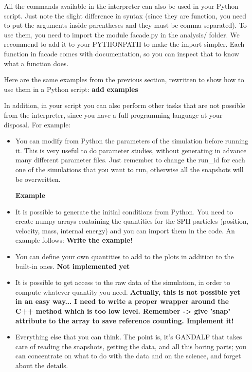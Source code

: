 \documentclass[a4paper]{article}
\begin{document}
All the commands available in the interpreter can also be used in your Python script. Just note the slight difference in syntax (since they are function, you need to put the arguments inside parentheses and they must be comma-separated). To use them, you need to import the module facade.py in the analysis/ folder. We recommend to add it to your PYTHONPATH to make the import simpler. Each function in facade comes with documentation, so you can inspect that to know what a function does.

Here are the same examples from the previous section, rewritten to show how to use them in a Python script:
\textbf{add examples}

In addition, in your script you can also perform other tasks that are not possible from the interpreter, since you have a full programming language at your disposal. For example:
\begin{itemize}

\item You can modify from Python the parameters of the simulation before running it. This is very useful to do parameter studies, without generating in advance many different parameter files. Just remember to change the run\_id for each one of the simulations that you want to run, otherwise all the snapshots will be overwritten.

\textbf{Example}

\item It is possible to generate the initial conditions from Python. You need to create numpy arrays containing the quantities for the SPH particles (position, velocity, mass, internal energy) and you can import them in the code. An example follows:
\textbf{Write the example!}

\item You can define your own quantities to add to the plots in addition to the built-in ones. \textbf{Not implemented yet}

\item It is possible to get access to the raw data of the simulation, in order to compute whatever quantity you need. \textbf{Actually, this is not possible yet in an easy way... I need to write a proper wrapper around the C++ method which is too low level. Remember -> give 'snap' attribute to the array to save reference counting. Implement it!}

\item Everything else that you can think. The point is, it's GANDALF that takes care of reading the snapshots, getting the data, and all this boring parts; you can concentrate on what to do with the data and on the science, and forget about the details.

\end{itemize}
\end{document}
